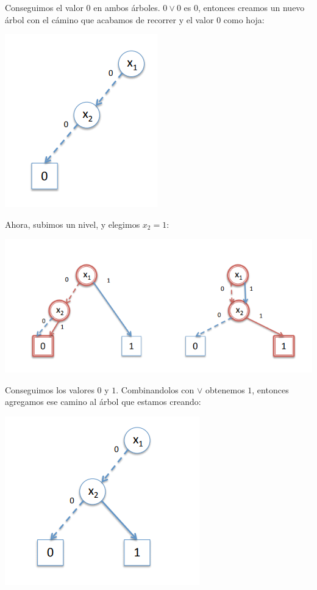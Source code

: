 Conseguimos el valor $0$ en ambos árboles. $0\lor0$ es $0$, entonces creamos un nuevo árbol con el cámino que acabamos de recorrer y el valor $0$ como hoja:
\begin{center}
	\includegraphics[scale=0.35]{imagenes/compo-robdd5}
\end{center}

Ahora, subimos un nivel, y elegimos $x_2 = 1$:

\begin{center}
	\includegraphics[scale=0.35]{imagenes/compo-robdd6}
\end{center}

Conseguimos los valores $0$ y $1$. Combinandolos con $\lor$ obtenemos $1$, entonces agregamos ese camino al árbol que estamos creando:

\begin{center}
	\includegraphics[scale=0.35]{imagenes/compo-robdd7}
\end{center}

